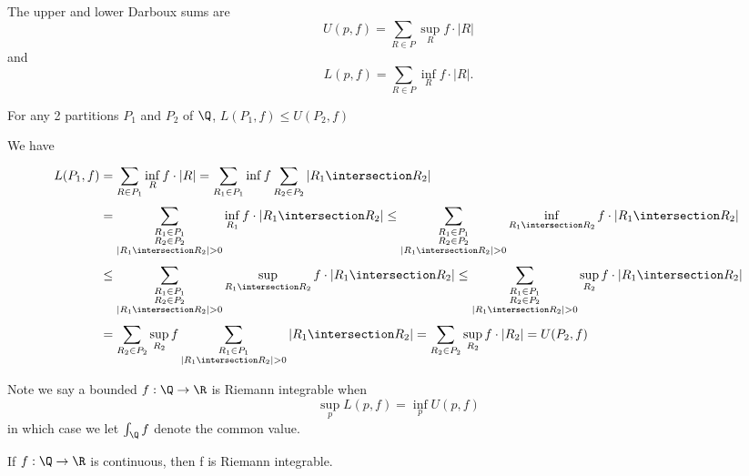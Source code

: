 \vline

\begin{definition}
	The upper and lower Darboux sums are 
	\[
		U(p,f) = \sum_{R \in P} \sup_R f \cdot |R|
	\] 
	and
	\[
		L(p,f) = \sum_{R \in P} \inf_R f \cdot |R|.
	\]	
\end{definition}

\begin{lemma}
	For any 2 partitions $P_1$ and $P_2$ of  $\Q$,  $L(P_1,f) \leq U(P_2, f)$
\end{lemma}

\begin{solution}
	We have
	\begin{align*}
		L(P_1, f) &= \sum_{R \in P_1}^{}  \inf_{R} f \cdot |R| = \sum_{R_1 \in P_1}^{} \inf f
		\sum_{R_2 \in P_2}^{} |R_1 \intersection R_2 | \\
				  &= \sum_{\substack{R_1 \in P_1 \\ R_2 \in P_2 \\ |R_1 \intersection R_2 | > 0} }^{} \inf_{R_1} f \cdot |R_1 \intersection R_2 |
				  \leq \sum_{\substack{R_1 \in P_1 \\ R_2 \in P_2 \\ |R_1 \intersection R_2 | > 0} }^{} \inf_{R_1 \intersection R_2} f \cdot |R_1 \intersection R_2 | \\
				  &\leq \sum_{\substack{R_1 \in P_1 \\ R_2 \in P_2 \\ |R_1 \intersection R_2 | > 0} }^{} \sup_{R_1 \intersection R_2} f \cdot |R_1 \intersection R_2 |
				  \leq \sum_{\substack{R_1 \in P_1 \\ R_2 \in P_2 \\ |R_1 \intersection R_2 | > 0} }^{} \sup_{R_2} f \cdot |R_1 \intersection R_2 | \\
				  &= \sum_{R_2 \in P_2}^{} \sup_{R_2} f \sum_{\substack{R_1 \in P_1 \\ |R_1 \intersection R_2 | > 0}}^{} |R_1 \intersection R_2 |  = \sum_{R_2 \in P_2}^{} \sup_{R_2} f \cdot |R_2| = U(P_2, f)
	\end{align*}
\end{solution}


Note we say a bounded $f : \Q \to \R$ is Riemann integrable when  
\[\sup_p L(p,f) = \inf_p U(p,f)\]
in which case we let  $\int_{\Q} f$ denote the common value.


\begin{theorem}
	If $f : \Q \to \R$ is continuous, then f is Riemann integrable.
\end{theorem}

